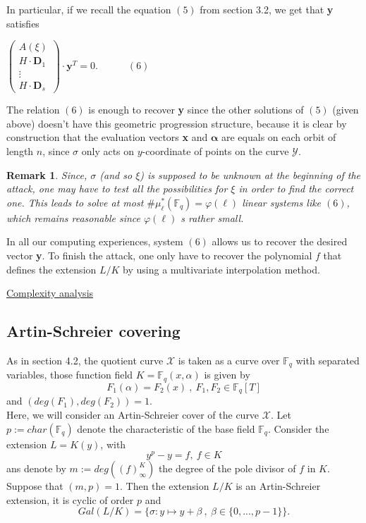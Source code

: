 \documentclass[10pt]{article}
\newtheorem{rq1}{Remark}[]
\newcommand{\s}{\vspace{0.3cm}}
\newcommand{\cd}{\cdot}
\newcommand{\fq}{\mathbb{F}_q}
\newcommand{\X}{\mathcal{X}}
\newcommand{\Y}{\mathcal{Y}}
\begin{document}
In particular, if we recall the equation $(5)$ from section 3.2, we get that \textbf{y} satisfies


\begin{center}
$\begin{pmatrix}
A(\xi) \\
H \cd \textbf{D}_1 \\
\vdots \\
H \cd \textbf{D}_s
\end{pmatrix}
\cd \textbf{y}^T = 0. \quad \quad \quad (6)$
\end{center}

The relation $(6)$ is enough to recover \textbf{y} since the other solutions of $(5)$ (given above) doesn't have this geometric progression structure, because it is clear by construction that the evaluation vectors \textbf{x} and $\boldsymbol{\alpha}$ are equals on each orbit of length $n$, since $\sigma$ only acts on $y$-coordinate of points on the curve $\Y$. 

\s

\begin{rq1} \rm
Since, $\sigma$ (and so $\xi$) is supposed to be unknown at the beginning of the attack, one may have to test all the possibilities for $\xi$ in order to find the correct one. This leads to solve at most $\#\mu^*_{\ell}(\fq) = \varphi(\ell)$ linear systems like $(6)$, which remains reasonable since $\varphi(\ell)$ s rather small.
\end{rq1}

\s

In all our computing experiences, system $(6)$ allows us to recover the desired vector \textbf{y}. To finish the attack, one only have to recover the polynomial $f$ that defines the extension $L/K$ by using a multivariate interpolation method. 

\s

\underline{Complexity analysis}

\s


\subsection{Artin-Schreier covering}

\s

As in section 4.2, the quotient curve $\X$ is taken as a curve over $\fq$ with separated variables, those function field $K = \fq(x,\alpha)$ is given by 
\[F_1(\alpha) = F_2(x) \ , \ F_1,F_2 \in \fq[T]\]
and $(deg(F_1),deg(F_2))=1$. \\ 
Here, we will consider an Artin-Schreier cover of the curve $\X$.
Let $p:=char(\fq)$ denote the characteristic of the base field $\fq$. Consider the extension $L=K(y)$, with
\[y^p-y = f , \ f \in K\]
ans denote by $m:=deg((f)^K_{\infty})$ the degree of the pole divisor of $f$ in $K$. Suppose that $(m,p)=1$. Then the extension $L/K$ is an Artin-Schreier extension, it is cyclic of order $p$ and 
\[Gal(L/K) = \{ \sigma : y \mapsto y + \beta \ , \ \beta \in \{0,...,p-1\}\}.\]
\end{document}
